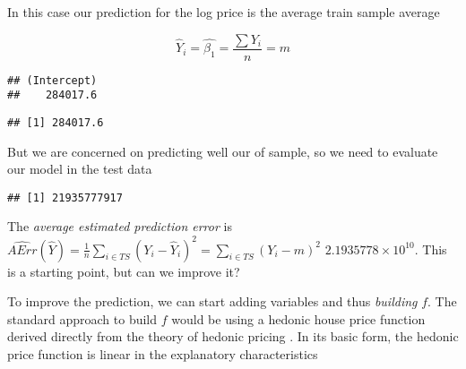 In this case our prediction for the log price is the average train
sample average

\[
\hat{Y}_i=\hat{\beta_1}=\frac{\sum Y_i}{n}=m
\]

\begin{Shaded}
\begin{Highlighting}[]
\end{Highlighting}
\end{Shaded}

\begin{verbatim}
## (Intercept) 
##    284017.6
\end{verbatim}

\begin{Shaded}
\begin{Highlighting}[]
\OperatorTok{$}
\end{Highlighting}
\end{Shaded}

\begin{verbatim}
## [1] 284017.6
\end{verbatim}

But we are concerned on predicting well our of sample, so we need to
evaluate our model in the test data

\begin{Shaded}
\begin{Highlighting}[]
\OperatorTok{$}
\OperatorTok{-}\OperatorTok{^}\NormalTok{))}
\end{Highlighting}
\end{Shaded}

\begin{verbatim}
## [1] 21935777917
\end{verbatim}

The {\it average estimated prediction error} is $\widehat{AErr}(\hat Y) = \frac 1 n  \sum_{i \in TS} \left(Y_i - \hat Y_i \right)^2= \sum_{i \in TS} \left(Y_i - m \right)^2$ 
\ensuremath{2.1935778\times 10^{10}}. This is a starting point, but can we improve it?

To improve the prediction, we can start adding variables and thus
\emph{building} \(f\). The standard approach to build \(f\) would be
using a hedonic house price function derived directly from the theory of
hedonic pricing \cite{rosen1974hedonic}. In its basic form, the hedonic
price function is linear in the explanatory characteristics

